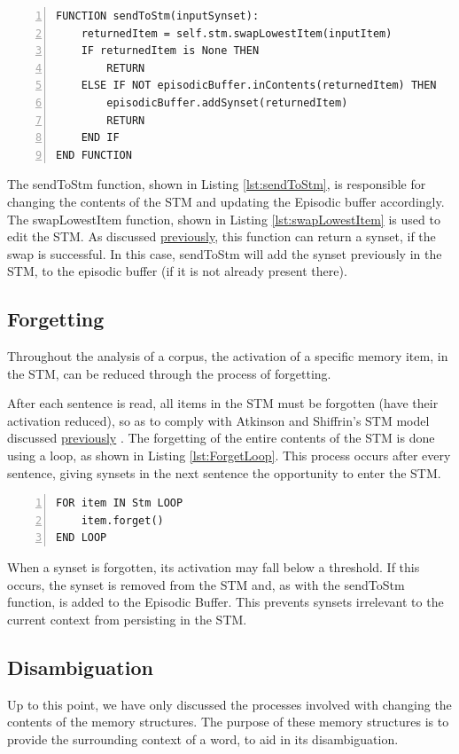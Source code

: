 \documentclass[]{article}
\begin{document}
\begin{lstlisting}[numbers=left, numberstyle=\small, caption={the sendToStm function}, captionpos=b, label={lst:sendToStm}]
FUNCTION sendToStm(inputSynset):
	returnedItem = self.stm.swapLowestItem(inputItem)
    IF returnedItem is None THEN
        RETURN
    ELSE IF NOT episodicBuffer.inContents(returnedItem) THEN
        episodicBuffer.addSynset(returnedItem)
        RETURN
    END IF
END FUNCTION
\end{lstlisting}

The sendToStm function, shown in Listing \ref{lst:sendToStm}, is responsible for changing the contents of the STM and updating the Episodic buffer accordingly. The swapLowestItem function, shown in Listing \ref{lst:swapLowestItem} is used to edit the STM. As discussed \hyperref[sec:ImplementedSTM]{previously}, this function can return a synset, if the swap is successful. In this case, sendToStm will add the synset previously in the STM, to the episodic buffer (if it is not already present there).

\subsection{Forgetting}
\label{sec:forgetting}
Throughout the analysis of a corpus, the activation of a specific memory item, in the STM, can be reduced through the process of forgetting.

After each sentence is read, all items in the STM must be forgotten (have their activation reduced), so as to comply with Atkinson and Shiffrin's STM model discussed \hyperref[ShortTerm]{previously} \cite{ControlProcessesSTMAtkinson}. The forgetting of the entire contents of the STM is done using a loop, as shown in Listing \ref{lst:ForgetLoop}. This process occurs after every sentence, giving synsets in the next sentence the opportunity to enter the STM.

\begin{lstlisting}[numbers=left, numberstyle=\small, caption={Forget loop}, captionpos=b, label={lst:ForgetLoop}]
FOR item IN Stm LOOP
	item.forget()
END LOOP
\end{lstlisting}

When a synset is forgotten, its activation may fall below a threshold. If this occurs, the synset is removed from the STM and, as with the sendToStm function, is added to the Episodic Buffer. This prevents synsets irrelevant to the current context from persisting in the STM.

\subsection{Disambiguation}
\label{sec:ImplementedDisambiguation}
Up to this point, we have only discussed the processes involved with changing the contents of the memory structures. The purpose of these memory structures is to provide the surrounding context of a word, to aid in its disambiguation. 
\end{document}
